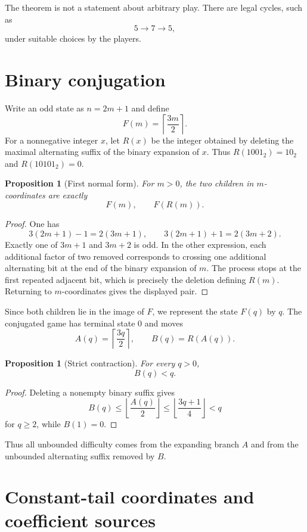 \documentclass[11pt]{article}
\newtheorem{proposition}[theorem]{Proposition}
\begin{document}
The theorem is not a statement about arbitrary play. There are legal cycles,
such as
\[
  5\longrightarrow 7\longrightarrow 5,
\]
under suitable choices by the players.

\section{Binary conjugation}

Write an odd state as $n=2m+1$ and define
\[
  F(m)=\left\lceil\frac{3m}{2}\right\rceil .
\]
For a nonnegative integer $x$, let $R(x)$ be the integer obtained by deleting
the maximal alternating suffix of the binary expansion of $x$. Thus
$R(1001_2)=10_2$ and $R(10101_2)=0$.

\begin{proposition}[First normal form]\label{prop:first-normal}
For $m>0$, the two children in $m$-coordinates are exactly
\[
  F(m),\qquad F(R(m)).
\]
\end{proposition}

\begin{proof}
One has
\[
  3(2m+1)-1=2(3m+1),\qquad
  3(2m+1)+1=2(3m+2).
\]
Exactly one of $3m+1$ and $3m+2$ is odd. In the other expression, each
additional factor of two removed corresponds to crossing one additional
alternating bit at the end of the binary expansion of $m$. The process stops
at the first repeated adjacent bit, which is precisely the deletion defining
$R(m)$. Returning to $m$-coordinates gives the displayed pair.
\end{proof}

Since both children lie in the image of $F$, we represent the state $F(q)$ by
$q$. The conjugated game has terminal state $0$ and moves
\[
  A(q)=\left\lceil\frac{3q}{2}\right\rceil,
  \qquad
  B(q)=R(A(q)).
\]

\begin{proposition}[Strict contraction]\label{prop:B-contracts}
For every $q>0$,
\[
  B(q)<q.
\]
\end{proposition}

\begin{proof}
Deleting a nonempty binary suffix gives
\[
  B(q)\le \left\lfloor\frac{A(q)}2\right\rfloor
       \le \left\lfloor\frac{3q+1}{4}\right\rfloor<q
\]
for $q\ge2$, while $B(1)=0$.
\end{proof}

Thus all unbounded difficulty comes from the expanding branch $A$ and from the
unbounded alternating suffix removed by $B$.

\section{Constant-tail coordinates and coefficient sources}
\end{document}
